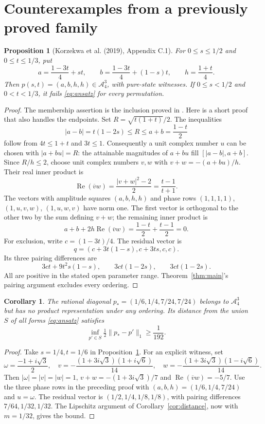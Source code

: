 \documentclass[11pt]{article}
\newtheorem{proposition}[theorem]{Proposition}
\newtheorem{corollary}[theorem]{Corollary}
\newcommand{\A}{\mathcal A}
\begin{document}
\section{Counterexamples from a previously proved family}
\begin{proposition}[Korzekwa et al. (2019), Appendix C.1]\label{prop:family}
For $0\le s\le1/2$ and $0\le t\le1/3$, put
\[
 a=\frac{1-3t}{4}+st,\qquad
 b=\frac{1-3t}{4}+(1-s)t,\qquad h=\frac{1+t}{4}.
\]
Then $p(s,t)=(a,b,h,h)\in\A_4^3$, with pure-state witnesses.
If $0\le s<1/2$ and $0<t<1/3$, it fails \eqref{eq:ansatz} for every
permutation.
\end{proposition}
\begin{proof}
The membership assertion is the inclusion proved in \cite[Appendix C.1]{KCPZ}.
Here is a short proof that also handles the endpoints.
Set $R=\sqrt{t(1+t)}/2$. The inequalities
\[
 |a-b|=t(1-2s)\le R\le a+b=\frac{1-t}{2}
\]
follow from $4t\le1+t$ and $3t\le1$. Consequently a unit complex number
$u$ can be chosen with $|a+bu|=R$: the attainable magnitudes of $a+bu$
fill $[|a-b|,a+b]$. Since $R/h\le2$, choose unit complex numbers $v,w$
with $v+w=-(a+bu)/h$. Their real inner product is
\[
 \operatorname{Re}(\overline v w)=\frac{|v+w|^2-2}{2}
 =\frac{t-1}{t+1}.
\]
The vectors with amplitude squares $(a,b,h,h)$ and phase rows
$(1,1,1,1)$, $(1,u,v,w)$, $(1,u,w,v)$ have norm one.
The first vector is orthogonal to the other two by the sum defining $v+w$;
the remaining inner product is
\[
 a+b+2h\operatorname{Re}(\overline v w)
 =\frac{1-t}{2}+\frac{t-1}{2}=0.
\]
For exclusion, write $c=(1-3t)/4$. The residual vector is
\[
 q=(c+3t(1-s),c+3ts,c,c).
\]
Its three pairing differences are
\[
 3ct+9t^2s(1-s),\qquad 3ct(1-2s),\qquad 3ct(1-2s).
\]
All are positive in the stated open parameter range. Theorem~\ref{thm:main}'s
pairing argument excludes every ordering.
\end{proof}

\begin{corollary}\label{cor:rational}
The rational diagonal $p_*=(1/6,1/4,7/24,7/24)$ belongs to $\A_4^3$
but has no product representation under any ordering. Its distance from
the union $S$ of all forms \eqref{eq:ansatz} satisfies
\[
 \inf_{p'\in S}\tfrac12\|p_*-p'\|_1\ge\frac1{192}.
\]
\end{corollary}
\begin{proof}
Take $s=1/4,t=1/6$ in Proposition~\ref{prop:family}.
For an explicit witness, set
\[
 \omega=\frac{-1+i\sqrt3}{2},\quad
 v=-\frac{(1+3i\sqrt3)(1+i\sqrt6)}{14},\quad
 w=-\frac{(1+3i\sqrt3)(1-i\sqrt6)}{14}.
\]
Then $|\omega|=|v|=|w|=1$, $v+w=-(1+3i\sqrt3)/7$ and
$\operatorname{Re}(\overline v w)=-5/7$.
Use the three phase rows in the preceding proof with
$(a,b,h)=(1/6,1/4,7/24)$ and $u=\omega$.
The residual vector is $(1/2,1/4,1/8,1/8)$, with pairing differences
$7/64,1/32,1/32$. The Lipschitz argument of
Corollary~\ref{cor:distance}, now with $m=1/32$, gives the bound.
\end{proof}
\end{document}
